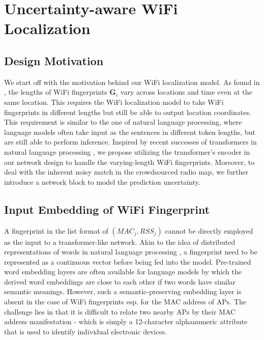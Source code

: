 \section{Uncertainty-aware WiFi Localization}
\label{sec:uncertainty_aware}

\subsection{Design Motivation}
We start off with the motivation behind our WiFi localization model. As found in \cite{wifioverview2017xia} 
, the lengths of WiFi fingerprints $\mathbf{G}_i$ vary across locations and time even at the same location. This requires the WiFi localization model to take WiFi fingerprints in different lengths but still be able to output location coordinates. This requirement is similar to the one of natural language processing, where language models often take input as the sentences in different token lengths, but are still able to perform inference. Inspired by recent successes of transformers in natural language processing \cite{vaswani2017attention,devlin2018bert}, 
we propose utilizing the transformer's encoder in our network design to handle the varying-length WiFi fingerprints.
Moreover, to deal with the inherent noisy match in the crowdsourced radio map, we further introduce a network block to model the prediction uncertainty. 



\subsection{Input Embedding of WiFi Fingerprint}
\label{sub:input_embedding}
A fingerprint in the list format of $(MAC_j, RSS_j)$ cannot be directly employed as the input to a transformer-like network. 
Akin to the idea of distributed representations of words in natural language processing \cite{mikolov2013efficient}, 
a fingerprint need to be represented as a continuous vector before being fed into the model. 
Pre-trained word embedding layers are often available for language models by which the derived word embeddings are close to each other if two words have similar semantic meanings. 
However, such a semantic-preserving embedding layer is absent in the case of WiFi fingerprints esp. for the MAC address of APs. The challenge lies in that it is difficult to relate two nearby APs by their MAC address manifestation - which is simply a 12-character alphanumeric attribute that is used to identify individual electronic devices. 


